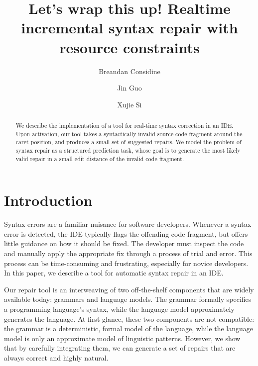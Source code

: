 \documentclass[runningheads]{llncs}
\begin{document}
%
\title{Let's wrap this up! Realtime incremental syntax repair with resource constraints}
%
%
\author{Breandan Considine \and
Jin Guo\and
Xujie Si}
%
%
%
\maketitle              %
%
\begin{abstract}
  We describe the implementation of a tool for real-time syntax correction in an IDE. Upon activation, our tool takes a syntactically invalid source code fragment around the caret position, and produces a small set of suggested repairs. We model the problem of syntax repair as a structured prediction task, whose goal is to generate the most likely valid repair in a small edit distance of the invalid code fragment.
\end{abstract}

\section{Introduction}

Syntax errors are a familiar nuisance for software developers. Whenever a syntax error is detected, the IDE typically flags the offending code fragment, but offers little guidance on how it should be fixed. The developer must inspect the code and manually apply the appropriate fix through a process of trial and error. This process can be time-consuming and frustrating, especially for novice developers. In this paper, we describe a tool for automatic syntax repair in an IDE.

Our repair tool is an interweaving of two off-the-shelf components that are widely available today: grammars and language models. The grammar formally specifies a programming language's syntax, while the language model approximately generates the language. At first glance, these two components are not compatible: the grammar is a deterministic, formal model of the language, while the language model is only an approximate model of linguistic patterns. However, we show that by carefully integrating them, we can generate a set of repairs that are always correct and highly natural.
\end{document}
